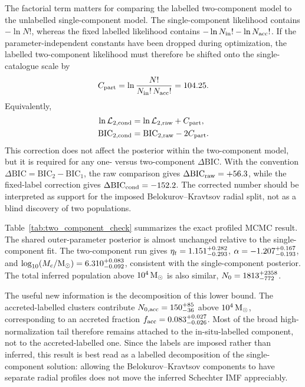 \documentclass[fleqn,usenatbib]{mnras}
\begin{document}
The factorial term matters for comparing the labelled two-component model to the unlabelled single-component model. The single-component likelihood contains $-\ln N!$, whereas the fixed labelled likelihood contains $-\ln N_{\rm in}!-\ln N_{\rm acc}!$. If the parameter-independent constants have been dropped during optimization, the labelled two-component likelihood must therefore be shifted onto the single-catalogue scale by
\begin{equation}
C_{\rm part}
=
\ln\frac{N!}{N_{\rm in}!\,N_{\rm acc}!}
=104.25 .
\end{equation}
Equivalently,
\begin{align}
\ln\mathcal{L}_{2,\mathrm{cond}}
&=
\ln\mathcal{L}_{2,\mathrm{raw}}+C_{\rm part},\\
\mathrm{BIC}_{2,\mathrm{cond}}
&=
\mathrm{BIC}_{2,\mathrm{raw}}-2C_{\rm part}.
\end{align}
This correction does not affect the posterior within the two-component model, but it is required for any one- versus two-component $\Delta\mathrm{BIC}$. With the convention $\Delta\mathrm{BIC}=\mathrm{BIC}_{2}-\mathrm{BIC}_{1}$, the raw comparison gives $\Delta\mathrm{BIC}_{\rm raw}=+56.3$, while the fixed-label correction gives $\Delta\mathrm{BIC}_{\rm cond}=-152.2$. The corrected number should be interpreted as support for the imposed Belokurov--Kravtsov radial split, not as a blind discovery of two populations.

Table~\ref{tab:two_component_check} summarizes the exact profiled MCMC result. The shared outer-parameter posterior is almost unchanged relative to the single-component fit. The two-component run gives $\eta_t=1.151_{-0.293}^{+0.282}$, $\alpha=-1.207_{-0.193}^{+0.167}$, and $\log_{10}(M_c/{\rm M}_\odot)=6.310_{-0.092}^{+0.083}$, consistent with the single-component posterior. The total inferred population above $10^4\,{\rm M}_\odot$ is also similar, $N_0=1813_{-772}^{+2358}$.

The useful new information is the decomposition of this lower bound. The accreted-labelled clusters contribute $N_{0,\rm acc}=150_{-36}^{+85}$ above $10^4\,{\rm M}_\odot$, corresponding to an accreted fraction $f_{\rm acc}=0.083_{-0.026}^{+0.027}$. Most of the broad high-normalization tail therefore remains attached to the in-situ-labelled component, not to the accreted-labelled one. Since the labels are imposed rather than inferred, this result is best read as a labelled decomposition of the single-component solution: allowing the Belokurov--Kravtsov components to have separate radial profiles does not move the inferred Schechter IMF appreciably.
\end{document}
